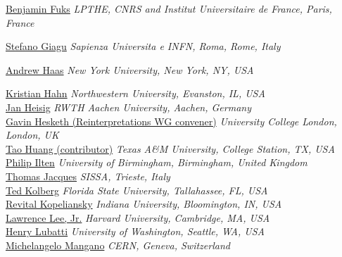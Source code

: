 \noindent\href{mailto:fuks@lpthe.jussieu.fr}{Benjamin Fuks}
\emph{LPTHE, CNRS and Institut Universitaire de France, Paris, France}

\noindent\href{mailto:stefano.giagu@cern.ch}{Stefano Giagu}
\emph{Sapienza Universita e INFN, Roma, Rome, Italy}

\noindent\href{mailto:drandyhaas@gmail.com}{Andrew Haas}
\emph{New York University, New York, NY, USA}

\noindent\href{mailto:kristian.hahn@northwestern.edu}{Kristian Hahn} 
\emph{Northwestern University, Evanston, IL, USA}\\

\noindent\href{mailto:heisig@physik.rwth-aachen.de}{Jan Heisig} 
\emph{RWTH Aachen University, Aachen, Germany}\\

\noindent\href{mailto:gavin.hesketh@ucl.ac.uk}{Gavin Hesketh (Reinterpretations WG convener)}
\emph{University College London, London, UK}\\

\noindent\href{mailto:tao.huang@cern.ch}{Tao Huang (contributor)}
\emph{Texas A\&M University, College Station, TX, USA}\\

\noindent\href{mailto:philip.james.ilten@cern.ch}{Philip Ilten}
\emph{University of Birmingham, Birmingham, United Kingdom}\\

\noindent\href{mailto:thomas.jacques@sissa.it}{Thomas Jacques}
\emph{SISSA, Trieste, Italy}\\

\noindent\href{mailto:ted.ritchie.kolberg@cern.ch}{Ted Kolberg}
\emph{Florida State University, Tallahassee, FL, USA}\\

\noindent\href{mailto:revital.kopeliansky@cern.ch}{Revital Kopeliansky}
\emph{Indiana University, Bloomington, IN, USA}\\

\noindent\href{mailto:lawrence.lee.jr@cern.ch}{Lawrence Lee, Jr.}
\emph{Harvard University, Cambridge, MA, USA}\\

\noindent\href{mailto:lubatti@u.washington.edu}{Henry Lubatti}
\emph{University of Washington, Seattle, WA, USA}\\

\noindent\href{mailto:Michelangelo.Mangano@cern.ch}{Michelangelo Mangano}
\emph{CERN, Geneva, Switzerland}\\

